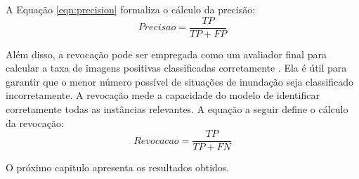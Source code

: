 A Equação \ref{eqn:precision} formaliza o cálculo da precisão:
\begin{equation}
    \label{eqn:precision}
    Precisao = \frac{TP}{TP+FP}
\end{equation}

Além disso, a revocação pode ser empregada como um avaliador final para calcular a taxa de imagens positivas classificadas corretamente \cite{MurphyProbabilistic}. 
Ela é útil para garantir que o menor número possível de situações de inundação seja classificado incorretamente. A revocação mede a capacidade do modelo de identificar corretamente todas as instâncias relevantes.
A equação a seguir define o cálculo da revocação:
\begin{equation}
    \label{eqn:recall}
    Revocacao = \frac{TP}{TP+FN}
\end{equation}

O próximo capitulo apresenta os resultados obtidos. 